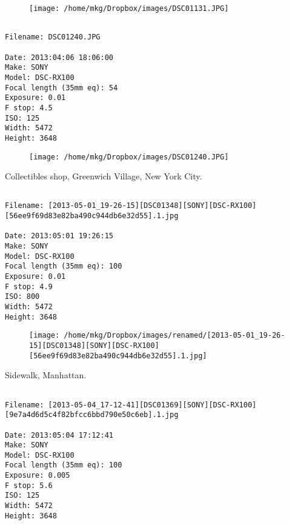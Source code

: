 \begin{figure}
\texttt{[image: /home/mkg/Dropbox/images/DSC01131.JPG]}
\end{figure}
    
\clearpage
\onecolumn
\noindent 
\noindent
\begin{lstlisting}

Filename: DSC01240.JPG

Date: 2013:04:06 18:06:00
Make: SONY
Model: DSC-RX100
Focal length (35mm eq): 54
Exposure: 0.01
F stop: 4.5
ISO: 125
Width: 5472
Height: 3648
\end{lstlisting}
\clearpage

\begin{figure}
\texttt{[image: /home/mkg/Dropbox/images/DSC01240.JPG]}
\end{figure}
    
\clearpage
\onecolumn
\noindent Collectibles shop, Greenwich Village, New York City.
\noindent
\begin{lstlisting}

Filename: [2013-05-01_19-26-15][DSC01348][SONY][DSC-RX100][56ee9f69d83e82ba490c944db6e32d55].1.jpg

Date: 2013:05:01 19:26:15
Make: SONY
Model: DSC-RX100
Focal length (35mm eq): 100
Exposure: 0.01
F stop: 4.9
ISO: 800
Width: 5472
Height: 3648
\end{lstlisting}
\clearpage

\begin{figure}
\texttt{[image: /home/mkg/Dropbox/images/renamed/[2013-05-01\_19-26-15][DSC01348][SONY][DSC-RX100][56ee9f69d83e82ba490c944db6e32d55].1.jpg]}
\end{figure}
    
\clearpage
\onecolumn
\noindent Sidewalk, Manhattan.
\noindent
\begin{lstlisting}

Filename: [2013-05-04_17-12-41][DSC01369][SONY][DSC-RX100][9e7a4d6d5c4f82bfcc6bbd790e50c6eb].1.jpg

Date: 2013:05:04 17:12:41
Make: SONY
Model: DSC-RX100
Focal length (35mm eq): 100
Exposure: 0.005
F stop: 5.6
ISO: 125
Width: 5472
Height: 3648
\end{lstlisting}
\clearpage

